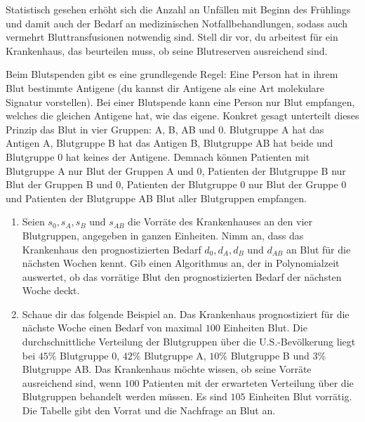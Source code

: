 \documentclass{uebung_cs}
\begin{document}
\begin{aufgabe}[Blutspende]
    Statistisch gesehen erhöht sich die Anzahl an Unfällen mit Beginn des Frühlings und damit auch der Bedarf an medizinischen Notfallbehandlungen, sodass auch vermehrt Bluttransfusionen notwendig sind. Stell dir vor, du arbeitest für ein Krankenhaus, das beurteilen muss, ob seine Blutreserven ausreichend sind.

    Beim Blutspenden gibt es eine grundlegende Regel: Eine Person hat in ihrem Blut bestimmte Antigene (du kannst dir Antigene als eine Art molekulare Signatur vorstellen). Bei einer Blutspende kann eine Person nur Blut empfangen, welches die gleichen Antigene hat, wie das eigene. Konkret gesagt unterteilt dieses Prinzip das Blut in vier Gruppen: A, B, AB und 0. Blutgruppe A hat das Antigen A, Blutgruppe B hat das Antigen B, Blutgruppe AB hat beide und Blutgruppe 0 hat keines der Antigene. Demnach können Patienten mit Blutgruppe A nur Blut der Gruppen A und 0, Patienten der Blutgruppe B nur Blut der Gruppen B und 0, Patienten der Blutgruppe 0 nur Blut der Gruppe 0 und Patienten der Blutgruppe AB Blut aller Blutgruppen empfangen.
    \begin{enumerate}
    	\item Seien $s_0,s_A,s_B$ und $s_{AB}$ die Vorräte des Krankenhauses an den vier Blutgruppen, angegeben in ganzen Einheiten. Nimm an, dass das Krankenhaus den prognostizierten Bedarf $d_0, d_A,d_B$ und $d_{AB}$ an Blut für die nächsten Wochen kennt. Gib einen Algorithmus an, der in Polynomialzeit auswertet, ob das vorrätige Blut den prognostizierten Bedarf der nächsten Woche deckt.
    	\item Schaue dir das folgende Beispiel an. Das Krankenhaus prognostiziert für die nächste Woche einen Bedarf von maximal $100$ Einheiten Blut. Die durchschnittliche Verteilung der Blutgruppen über die U.S.-Bevölkerung liegt bei $45\%$ Blutgruppe 0, $42\%$ Blutgruppe A, $10\%$ Blutgruppe B und $3\%$ Blutgruppe AB. Das Krankenhaus möchte wissen, ob seine Vorräte ausreichend sind, wenn $100$ Patienten mit der erwarteten Verteilung über die Blutgruppen behandelt werden müssen. Es sind $105$ Einheiten Blut vorrätig. Die Tabelle gibt den Vorrat und die Nachfrage an Blut an.
    	

\end{enumerate}
\end{aufgabe}
\end{document}
